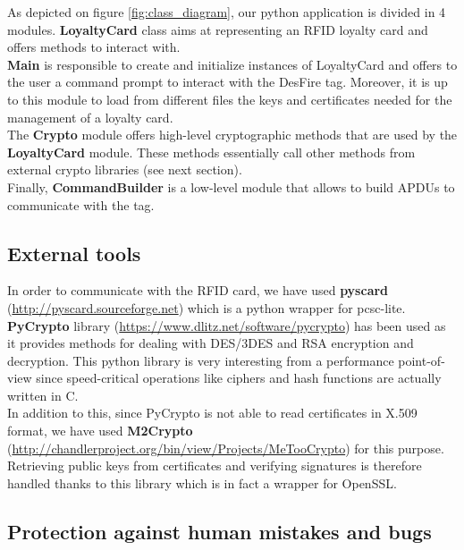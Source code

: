 \documentclass[a4paper,11pt,oneside]{article}
\begin{document}
As depicted on figure \ref{fig:class_diagram}, our python application is divided in 4 modules. \textbf{LoyaltyCard} class aims at representing an RFID loyalty card and offers methods to interact with. \\
\textbf{Main} is responsible to create and initialize instances of LoyaltyCard and offers to the user a command prompt to interact with the DesFire tag. Moreover, it is up to this module to load from different files the keys and certificates needed for the management of a loyalty card. \\
The \textbf{Crypto} module offers high-level cryptographic methods that are used by the \textbf{LoyaltyCard} module. These methods essentially call other methods from external crypto libraries (see next section). \\
Finally, \textbf{CommandBuilder} is a low-level module that allows to build APDUs to communicate with the tag. \\


\subsection{External tools}

In order to communicate with the RFID card, we have used \textbf{pyscard} (\url{http://pyscard.sourceforge.net}) which is a python wrapper for pcsc-lite. \\

\textbf{PyCrypto} library (\url{https://www.dlitz.net/software/pycrypto}) has been used as it provides methods for dealing with DES/3DES and RSA encryption and decryption. This python library is very interesting from a performance point-of-view since speed-critical operations like ciphers and hash functions are actually written in C. \\

In addition to this, since PyCrypto is not able to read certificates in X.509 format, we have used \textbf{M2Crypto} (\url{http://chandlerproject.org/bin/view/Projects/MeTooCrypto}) for this purpose. Retrieving public keys from certificates and verifying signatures is therefore handled thanks to this library which is in fact a wrapper for OpenSSL. \\ 

\subsection{Protection against human mistakes and bugs}
\end{document}
